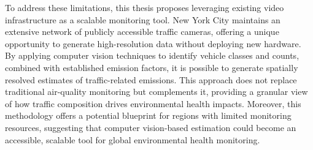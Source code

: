 To address these limitations, this thesis proposes leveraging existing video
infrastructure as a scalable monitoring tool. New York City maintains an
extensive network of publicly accessible traffic cameras, offering a unique
opportunity to generate high-resolution data without deploying new hardware.
By applying computer vision techniques to identify vehicle classes and counts,
combined with established emission factors, it is possible to generate 
spatially resolved estimates of traffic-related emissions. This approach does
not replace traditional air-quality monitoring but complements it, providing a 
granular view of how traffic composition drives environmental health impacts. 
Moreover, this methodology offers a potential blueprint for regions with 
limited monitoring resources, suggesting that computer vision-based estimation 
could become an accessible, scalable tool for global environmental health 
monitoring.


